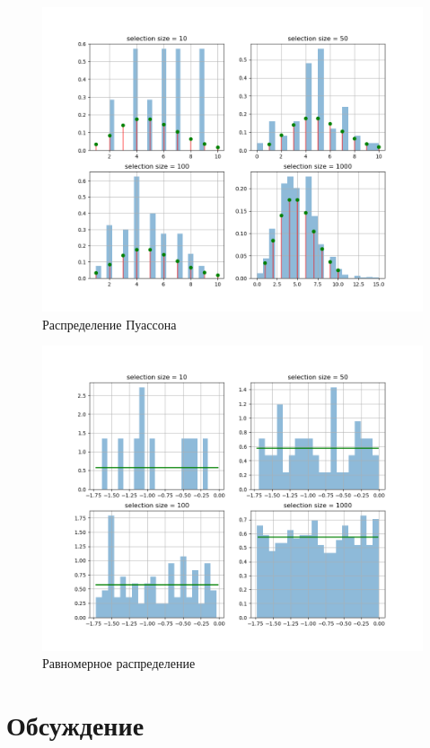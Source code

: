 \documentclass[a4]{article}
\begin{document}
\begin{center}
				\begin{figure}
					\includegraphics[width=\textwidth]{poisson.png}
					\caption[Распределение Пуассона]{Распределение Пуассона}
				\end{figure}
				\begin{figure}
					\includegraphics[width=\textwidth]{uniform.png}
					\caption[Равномерное распределение]{Равномерное распределение}
				\end{figure}
	
		\end{center}
		
	\section{Обсуждение}
\end{document}
